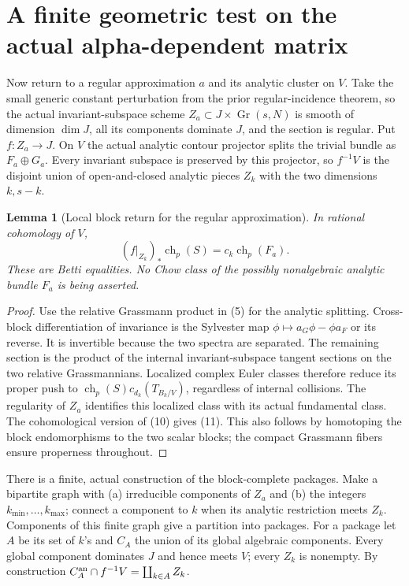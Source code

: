 \documentclass[11pt]{article}
\newtheorem{lemma}[theorem]{Lemma}
\newcommand{\ch}{\operatorname{ch}}
\newcommand{\Gr}{\operatorname{Gr}}
\begin{document}
\section{A finite geometric test on the actual alpha-dependent matrix}
Now return to a regular approximation $a$ and its analytic cluster on $V$.
Take the small generic constant perturbation from the prior regular-incidence
theorem, so the actual invariant-subspace scheme $Z_a\subset J\times\Gr(s,N)$
is smooth of dimension $\dim J$, all its components dominate $J$, and
the section is regular. Put $f:Z_a\to J$.
On $V$ the actual analytic contour projector splits the trivial bundle as
$F_a\oplus G_a$. Every invariant subspace is preserved by this projector,
so $f^{-1}V$ is the disjoint union of open-and-closed analytic pieces $Z_k$
with the two dimensions $k,s-k$.

\begin{lemma}[Local block return for the regular approximation]
In rational cohomology of $V$,
\[
 (f|_{Z_k})_*\ch_p(S)=c_k\ch_p(F_a).                  \tag{11}
\]
These are Betti equalities. No Chow class of the possibly nonalgebraic
analytic bundle $F_a$ is being asserted.
\end{lemma}
\begin{proof}
Use the relative Grassmann product in (5) for the analytic splitting.
Cross-block differentiation of invariance is the Sylvester map
$\phi\mapsto a_G\phi-\phi a_F$ or its reverse. It is invertible because
the two spectra are separated. The remaining section is the product of
the internal invariant-subspace tangent sections on the two relative
Grassmannians. Localized complex Euler classes therefore reduce its proper
push to $\ch_p(S)c_{d_k}(T_{B_k/V})$, regardless of internal collisions.
The regularity of $Z_a$ identifies this localized class with its actual
fundamental class. The cohomological version of (10) gives (11).
This also follows by homotoping the block endomorphisms to the two scalar
blocks; the compact Grassmann fibers ensure properness throughout.
\end{proof}

There is a finite, actual construction of the block-complete packages.
Make a bipartite graph with (a) irreducible components of $Z_a$ and (b)
the integers $k_{\min},\ldots,k_{\max}$; connect a component to $k$ when
its analytic restriction meets $Z_k$. Components of this finite graph
give a partition into packages. For a package let $A$ be its set of $k$'s
and $C_A$ the union of its global algebraic components. Every global
component dominates $J$ and hence meets $V$; every $Z_k$ is nonempty.
By construction
$C_A^{\rm an}\cap f^{-1}V=\coprod_{k\in A}Z_k$.
\end{document}
